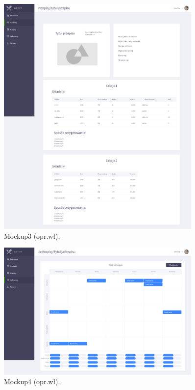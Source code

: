 \begin{minipage}{\textwidth}
    \begin{figure}[H]
        \centering\includegraphics[width=0.9\textwidth]{img/mockups/mockup3.png}
        \caption{Mockup3 (opr.wł).}\label{rysunek:mockup3}
    \end{figure}
\end{minipage}

\begin{minipage}{\textwidth}
    \begin{figure}[H]
        \centering\includegraphics[width=0.9\textwidth]{img/mockups/mockup4.png}
        \caption{Mockup4 (opr.wł).}\label{rysunek:mockup4}
    \end{figure}
\end{minipage}

